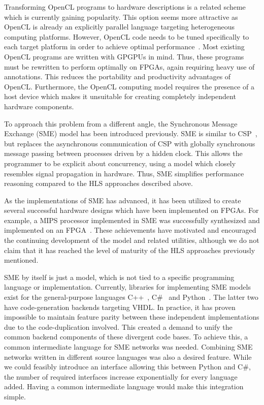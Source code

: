 Transforming OpenCL programs to hardware descriptions is a related scheme which
is currently gaining popularity. This option seems more attractive as OpenCL is
already an explicitly parallel language targeting heterogeneous computing
platforms. However, OpenCL code needs to be tuned specifically to each target
platform in order to achieve optimal performance~\cite{chen2012using}. Most
existing OpenCL programs are written with GPGPUs in mind. Thus, these programs
must be rewritten to perform optimally on FPGAs, again requiring heavy use of
annotations. This reduces the portability and productivity advantages of OpenCL.
Furthermore, the OpenCL computing model requires the presence of a host device
which makes it unsuitable for creating completely independent hardware
components.

To approach this problem from a different angle, the Synchronous Message
Exchange (SME) model\cite{vinter2015bus,vinter2014synchronous} has been
introduced previously. SME is similar to CSP~\cite{csp}, but replaces the
asynchronous communication of CSP with globally synchronous message passing
between processes driven by a hidden clock.
This allows the programmer to be explicit about concurrency, using a model which
closely resembles signal propagation in hardware. Thus, SME simplifies
performance reasoning compared to the HLS approaches described above.

As the implementations of SME has advanced, it has been utilized to create
several successful hardware designs which have been implemented on FPGAs. For
example, a MIPS processor implemented in SME was successfully synthesized and
implemented on an FPGA~\cite{johnsen2017thesis}. These achievements have
motivated and encouraged the continuing development of the model and related
utilities, although we do not claim that it has reached the level of maturity of
the HLS approaches previously mentioned.

SME by itself is just a model, which is not tied to a specific programming
language or implementation. Currently, libraries for implementing SME models
exist for the general-purpose languages C++~\cite{asheim2015},
C\#~\cite{skovhede2016building} and Python~\cite{asheim2016vhdl}. The latter two
have code-generation backends targeting VHDL. In practice, it has proven
impossible to maintain feature parity between these independent implementations
due to the code-duplication involved. This created a demand to unify the common
backend components of these divergent code bases. To achieve this, a common
intermediate language for SME networks was needed. Combining SME networks
written in different source languages was also a desired feature. While we could
feasibly introduce an interface allowing this between Python and C\#, the number
of required interfaces increase exponentially for every language added. Having a
common intermediate language would make this integration simple.

